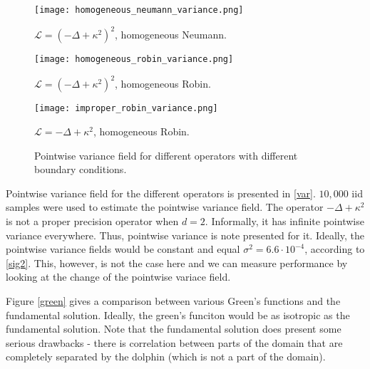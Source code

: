 \documentclass[paper=a4, fontsize=11pt]{scrartcl} %
\numberwithin{equation}{section} %
\numberwithin{figure}{section} %
\numberwithin{table}{section} %
\newcommand{\Op}{\mathcal{L}}
\begin{document}
\begin{figure}[!htb]
  \texttt{[image: homogeneous\_neumann\_variance.png]}
   \caption*{$\Op = (-\Delta + \kappa^2)^2$, homogeneous Neumann.}
\endminipage\hfill
{}
  \texttt{[image: homogeneous\_robin\_variance.png]}
   \caption*{$\Op = (-\Delta + \kappa^2)^2$, homogeneous Robin.}
\endminipage\hfill
{}
  \texttt{[image: improper\_robin\_variance.png]}
   \caption*{$\Op = -\Delta + \kappa^2$, homogeneous Robin.}
\endminipage
 \caption{Pointwise variance field for different operators with different boundary conditions.}
\end{figure}
  
Pointwise variance field for the different operators is presented in \ref{var}.
$10,000$ iid samples were used to estimate the pointwise variance field. 
The operator $-\Delta + \kappa^2$ is not a proper precision operator when $d=2$. 
Informally, it has infinite pointwise variance everywhere. Thus, pointwise
variance is note presented for it. Ideally, the pointwise
variance fields would be constant and equal 
$\sigma^2 = 6.6 \cdot 10^{-4}$, according to \ref{sig2}. This, 
however, is not the case here and we can measure performance
by looking at the change of the pointwise variace field.

Figure \ref{green} gives a comparison between various Green's functions
and the fundamental solution. Ideally, the green's funciton would be as
isotropic as the fundamental solution. Note that the fundamental solution
does present some serious drawbacks - there is correlation between parts of
the domain that are completely separated by the dolphin (which is not
a part of the domain).





\end{document}
